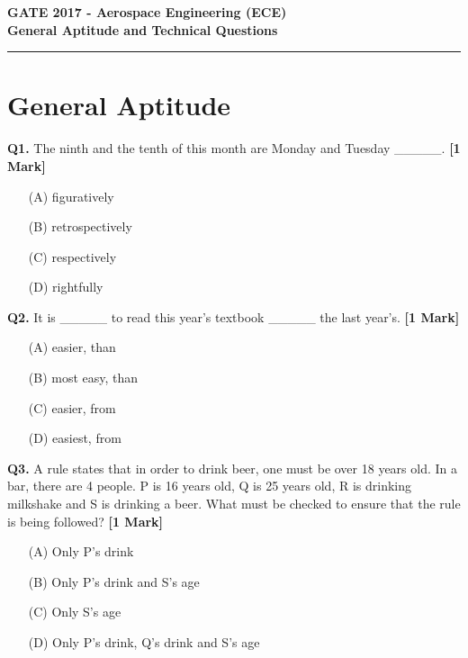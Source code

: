 \documentclass[11pt]{article}
\newcommand{\questiona}[2]{
    \noindent\textbf{Q#2.} #1 \hfill \textbf{[1 Mark]}
}
\begin{document}
\begin{center}
    \Large\textbf{GATE 2017 - Aerospace Engineering (ECE)} \\
    \large\textbf{General Aptitude and Technical Questions} \\
    \rule{\textwidth}{0.5pt} %
\end{center}

\vspace{0.5cm}

\section*{General Aptitude}

\questiona{The ninth and the tenth of this month are Monday and Tuesday \_\_\_\_\_.}{1}
\begin{enumerate}
    \item[(A)] figuratively  
    \item[(B)] retrospectively  
    \item[(C)] respectively  
    \item[(D)] rightfully  
\end{enumerate}

\vspace{0.5cm}

\questiona{It is \_\_\_\_\_ to read this year's textbook \_\_\_\_\_ the last year's.}{2}
\begin{enumerate}
    \item[(A)] easier, than  
    \item[(B)] most easy, than  
    \item[(C)] easier, from  
    \item[(D)] easiest, from  
\end{enumerate}

\vspace{0.5cm}

\questiona{A rule states that in order to drink beer, one must be over 18 years old. In a bar, there are 4 people. P is 16 years old, Q is 25 years old, R is drinking milkshake and S is drinking a beer. What must be checked to ensure that the rule is being followed?}{3}
\begin{enumerate}
    \item[(A)] Only P's drink  
    \item[(B)] Only P's drink and S's age  
    \item[(C)] Only S's age  
    \item[(D)] Only P's drink, Q's drink and S's age  
\end{enumerate}
\end{document}
